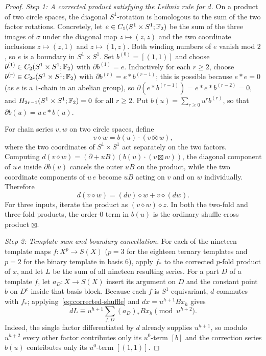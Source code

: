\begin{proof}
\emph{Step 1: A corrected product satisfying the Leibniz rule for $d$.} On a product of two circle spaces, the diagonal $S^1$-rotation is homologous to the sum of the two factor rotations. Concretely, let $e\in C_1(S^1\times S^1;\mathbb F_2)$ be the sum of the three images of $\sigma$ under the diagonal map $z\mapsto(z,z)$ and the two coordinate inclusions $z\mapsto(z,1)$ and $z\mapsto(1,z)$. Both winding numbers of $e$ vanish mod $2$, so $e$ is a boundary in $S^1\times S^1$. Set $b^{(0)}=[(1,1)]$ and choose $b^{(1)}\in C_2(S^1\times S^1;\mathbb F_2)$ with $\partial b^{(1)}=e$. Inductively for each $r\ge2$, choose $b^{(r)}\in C_{2r}(S^1\times S^1;\mathbb F_2)$ with $\partial b^{(r)}=e*b^{(r-1)}$; this is possible because $e*e=0$ (as $e$ is a $1$-chain in an abelian group), so $\partial(e*b^{(r-1)})=e*e*b^{(r-2)}=0$, and $H_{2r-1}(S^1\times S^1;\mathbb F_2)=0$ for all $r\ge2$. Put $b(u)=\sum_{r\ge0} u^r b^{(r)}$, so that $\partial b(u)=u\,e*b(u)$.

For chain series $v,w$ on two circle spaces, define
\[
 v\diamond w=b(u)\cdot(v\boxtimes w),
\]
where the two coordinates of $S^1\times S^1$ act separately on the two factors. Computing $d(v\diamond w)=(\partial+uB)(b(u)\cdot(v\boxtimes w))$, the diagonal component of $u\,e$ inside $\partial b(u)$ cancels the outer $uB$ on the product, while the two coordinate components of $u\,e$ become $uB$ acting on $v$ and on $w$ individually. Therefore
\begin{equation}\label{eq:corrected-shuffle}
 d(v\diamond w)=(dv)\diamond w+v\diamond(dw).
\end{equation}
For three inputs, iterate the product as $(v\diamond w)\diamond z$. In both the two-fold and three-fold products, the order-$0$ term in $b(u)$ is the ordinary shuffle cross product $\boxtimes$.

\emph{Step 2: Template sum and boundary cancellation.} For each of the nineteen template maps $f:X^p\to S(X)$ ($p=3$ for the eighteen ternary templates and $p=2$ for the binary template in basis $6$), apply $f_*$ to the corrected $p$-fold product of $x$, and let $L$ be the sum of all nineteen resulting series. For a part $D$ of a template $f$, let $a_D:X\to S(X)$ insert its argument on $D$ and the constant point $b$ on $D^c$ inside that basis block. Because each $f$ is $S^1$-equivariant, $d$ commutes with $f_*$; applying~\eqref{eq:corrected-shuffle} and $dx=u^{h+1}Bx_h$ gives
\[
 dL\equiv u^{h+1}\sum_{f,D} (a_D)_* Bx_h \pmod{u^{h+2}}.
\]
Indeed, the single factor differentiated by $d$ already supplies $u^{h+1}$, so modulo $u^{h+2}$ every other factor contributes only its $u^0$-term $[b]$ and the correction series $b(u)$ contributes only its $u^0$-term $[(1,1)]$.


\end{proof}

